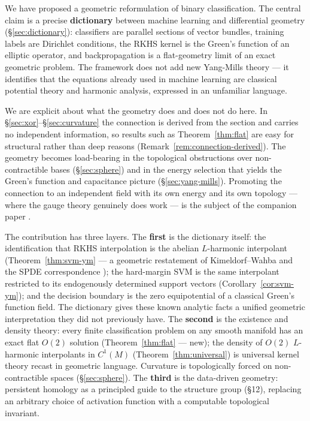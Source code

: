 \documentclass[11pt, a4paper]{article}
\theoremstyle{plain}
\theoremstyle{definition}
\begin{document}
We have proposed a geometric reformulation of binary classification. The central
claim is a precise \textbf{dictionary} between machine learning and differential
geometry (\S\ref{sec:dictionary}): classifiers are parallel sections of vector
bundles, training labels are Dirichlet conditions, the RKHS kernel is the Green's
function of an elliptic operator, and backpropagation is a flat-geometry limit of
an exact geometric problem. The framework does not add new Yang-Mills theory --- it
identifies that the equations already used in machine learning are classical
potential theory and harmonic analysis, expressed in an unfamiliar language.

We are explicit about what the geometry does and does not do here. In
\S\ref{sec:xor}--\S\ref{sec:curvature} the connection is derived from the section
and carries no independent information, so results such as
Theorem~\ref{thm:flat} are easy for structural rather than deep reasons
(Remark~\ref{rem:connection-derived}). The geometry becomes load-bearing in the
topological obstructions over non-contractible bases (\S\ref{sec:sphere}) and in
the energy selection that yields the Green's function and capacitance picture
(\S\ref{sec:yang-mills}). Promoting the connection to an independent field with
its own energy and its own topology --- where the gauge theory genuinely does
work --- is the subject of the companion paper \cite{Vasii2026Paper2}.

The contribution has three layers. The \textbf{first} is the dictionary itself:
the identification that RKHS interpolation is the abelian $L$-harmonic interpolant
(Theorem~\ref{thm:svm-ym} --- a geometric restatement of Kimeldorf--Wahba
\cite{kimeldorf1971some} and the SPDE correspondence
\cite{lindgren2011spde}); the hard-margin SVM is the same interpolant
restricted to its endogenously determined support vectors
(Corollary~\ref{cor:svm-ym}); and the decision boundary is the zero
equipotential of a classical Green's function field. The dictionary gives these
known analytic facts a unified geometric interpretation they did not previously
have. The \textbf{second} is the existence and density theory: every finite
classification problem on any smooth manifold has an exact flat $O(2)$ solution
(Theorem~\ref{thm:flat} --- new); the density of $O(2)$ $L$-harmonic interpolants
in $C^1(M)$ (Theorem~\ref{thm:universal}) is universal kernel theory
\cite{steinwart2001,micchelli2006} recast in geometric language. Curvature is
topologically forced on non-contractible spaces (\S\ref{sec:sphere}).
The \textbf{third} is the data-driven geometry: persistent homology as a
principled guide to the structure group (\S12), replacing an arbitrary choice of
activation function with a computable topological invariant.
\end{document}
